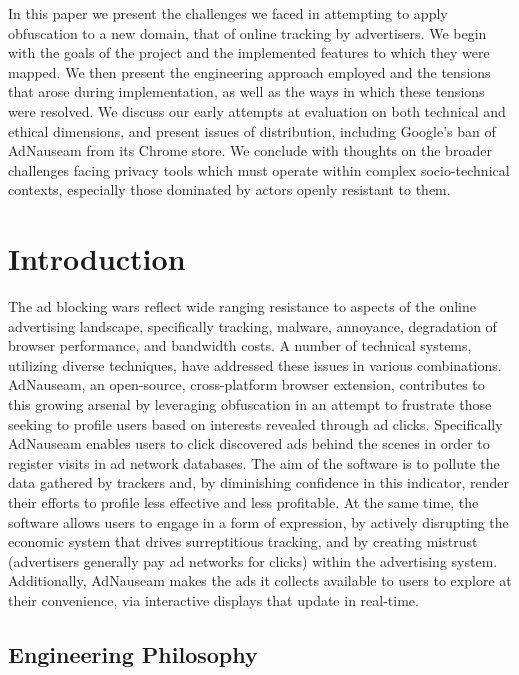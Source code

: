 \documentclass[conference]{IEEEtran}
\begin{document}
\indent In this paper we present the challenges we faced in attempting to apply obfuscation to a new domain, that of online tracking by advertisers. We begin with the goals of the project and the implemented features to which they were mapped. We then present the engineering approach employed and the tensions that arose during implementation, as well as the ways in which these tensions were resolved. We discuss our early attempts at evaluation on both technical and ethical dimensions, and present issues of distribution, including Google's ban of AdNauseam from its Chrome store. We conclude with thoughts on the broader challenges facing privacy tools which must operate within complex socio-technical contexts, especially those dominated by actors openly resistant to them.


\section{Introduction}

The ad blocking wars \cite{Murphy} reflect wide ranging resistance to aspects of the online advertising landscape, specifically tracking, malware, annoyance, degradation of browser performance, and bandwidth costs. A number of technical systems, utilizing diverse techniques, have addressed these issues in various combinations. AdNauseam, an open-source, cross-platform browser extension, contributes to this growing arsenal by leveraging obfuscation in an attempt to frustrate those seeking to profile users based on interests revealed through ad clicks. Specifically AdNauseam enables users to click discovered ads behind the scenes in order to register visits in ad network databases. The aim of the software is to pollute the data gathered by trackers and, by diminishing confidence in this  indicator, render their efforts to profile less effective and less profitable. At the same time, the software allows users to engage in a form of expression, by actively disrupting the economic system that drives surreptitious tracking, and by creating mistrust (advertisers generally pay ad networks for clicks) within the advertising system. Additionally, AdNauseam makes the ads it collects available to users to explore at their convenience, via interactive displays that update in real-time.

\subsection{Engineering Philosophy}
\end{document}
